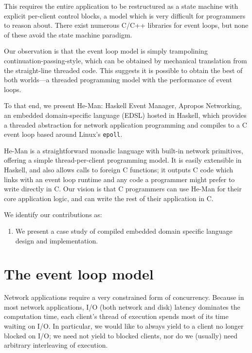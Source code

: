 \documentclass[preprint]{sigplanconf}
\renewcommand{\t}{\texttt}
\begin{document}
This requires the entire application to be restructured as a state machine with
explicit per-client control blocks, a model which is very difficult for
programmers to reason about. There exist numerous C/C++ libraries for event
loops, but none of these avoid the state machine paradigm.

Our observation is that the event loop model is simply trampolining
continuation-passing-style, %
which can be obtained by mechanical translation from the straight-line threaded
code. This suggests it is possible to obtain the best of both worlds---a
threaded programming model with the performance of event loops. 

To that end, we present He-Man: Haskell Event Manager, Apropos Networking, an
embedded domain-specific language (EDSL) hosted in Haskell, which provides a
threaded abstraction for network application programming and compiles to a C
event loop based around Linux's \t{epoll}.

He-Man is a straightforward monadic language with built-in network primitives,
offering a simple thread-per-client programming model. It is easily extensible
in Haskell, and also allows calls to foreign C functions; it outputs C code
which links with an event loop runtime and any code a programmer might prefer to
write directly in C. Our vision is that C programmers can use He-Man for their
core application logic, and can write the rest of their application in C. 

We identify our contributions as:
\begin{enumerate}

\item We present a case study of compiled embedded domain specific
  language design and implementation.
\end{enumerate}

\section{The event loop model}

Network applications require a very constrained form of
concurrency. Because in most network applications, I/O (both network
and disk) latency dominates the computation time, each client's thread
of execution spends most of its time waiting on I/O. In particular, we
would like to always yield to a client no longer blocked on I/O; we
need not yield to blocked clients, nor do we (usually) need arbitrary
interleaving of execution.
\end{document}
